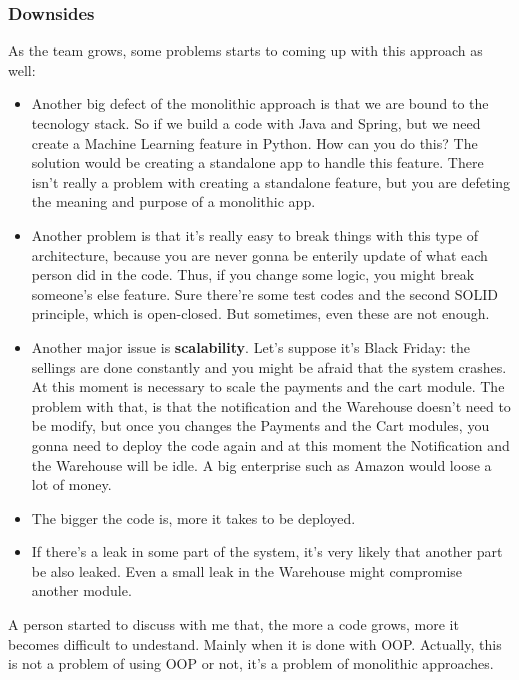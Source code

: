 \subsubsection{Downsides}
As the team grows, some problems starts to coming up with this approach as well:
\begin{itemize}
    \item Another big defect of the monolithic approach is that we are bound to the 
tecnology stack. So if we build a code with Java and Spring, but we need create a 
Machine Learning feature in Python. How can you do this? The solution would be creating a
standalone app to handle this feature. There isn't really a problem with creating a 
standalone feature, but you are defeting the meaning and purpose of a monolithic app. 
    \item Another problem is that it's really easy to break things with this type of 
architecture, because you are never gonna be enterily update of what each person did in the 
code. Thus, if you change some logic, you might break someone's else feature. Sure there're 
some test codes and the second SOLID principle, which is open-closed. But sometimes, even these
are not enough. 
    \item Another major issue is \textbf{scalability}. Let's suppose it's Black Friday: the 
sellings are done constantly and you might be afraid that the system crashes. At this moment 
is necessary to scale the payments and the cart module. The problem with that, is that the 
notification and the Warehouse doesn't need to be modify, but once you changes the Payments and 
the Cart modules, you gonna need to deploy the code again and at this moment the Notification and 
the Warehouse will be idle. A big enterprise such as Amazon would loose a lot of money.  
    \item The bigger the code is, more it takes to be deployed. 
    \item If there's a leak in some part of the system, it's very likely that another part be also
    leaked. Even a small leak in the Warehouse might compromise another module. 
\end{itemize}


\begin{tcolorbox}
    A person started to discuss with me that, the more a code grows, more it becomes difficult to 
    undestand. Mainly when it is done with OOP. Actually, this is not a problem of using OOP or not,
    it's a problem of monolithic approaches. 
\end{tcolorbox}


